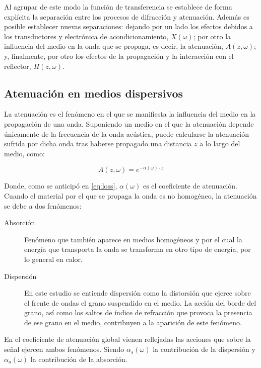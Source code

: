 Al agrupar de este modo la función de transferencia se establece de forma
explícita la separación entre los procesos de difracción y atenuación.
Además es posible establecer nuevas separaciones: dejando por un lado los
efectos debidos a los transductores y electrónica de acondicionamiento,
$X(\omega)$; por otro la influencia del medio en la onda que se propaga, es
decir, la atenuación, $A(z, \omega)$; y, finalmente, por otro los efectos
de la propagación y la interacción con el reflector, $H(z, \omega)$.


\subsection{Atenuación en medios dispersivos}

La atenuación es el fenómeno en el que se manifiesta la influencia del
medio en la propagación de una onda. Suponiendo un medio en el que la
atenuación depende únicamente de la frecuencia de la onda acústica, puede
calcularse la atenuación sufrida por dicha onda tras haberse propagado una
distancia $z$ a lo largo del medio, como:

\begin{equation}
	A(z, \omega) = e^{-\alpha(\omega)\cdot z}
	\label{eq:independentloss}
\end{equation}

Donde, como se anticipó en \eqref{eq:loss}, $\alpha(\omega)$ es el
coeficiente de atenuación. Cuando el material por el que se propaga la onda
es no homogéneo, la atenuación se debe a dos fenómenos:

\begin{description}
	\item[Absorción] Fenómeno que también aparece en medios homogéneos
		y por el cual la energía que transporta la onda se
		transforma en otro tipo de energía, por lo general en
		calor.
	\item[Dispersión] En este estudio se entiende dispersión como la
		distorsión que ejerce sobre el frente de ondas el grano
		suspendido en el medio. La acción del borde del grano, así
		como los saltos de índice de refracción que provoca la
		presencia de ese grano en el medio, contribuyen a la
		aparición de este fenómeno.
\end{description}

En el coeficiente de atenuación global vienen reflejadas las acciones que
sobre la señal ejercen ambos fenómenos. Siendo $\alpha_s(\omega)$ la
contribución de la dispersión y $\alpha_a(\omega)$ la contribución de la
absorción.

